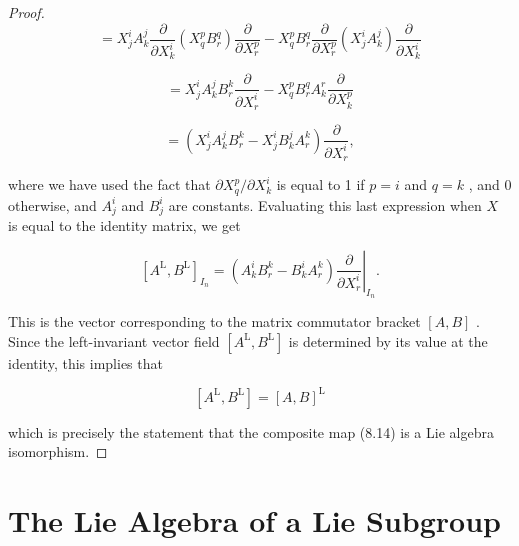 \begin{proof}
\[
= {X}_{j}^{i}{A}_{k}^{j}\frac{\partial }{\partial {X}_{k}^{i}}\left( {{X}_{q}^{p}{B}_{r}^{q}}\right) \frac{\partial }{\partial {X}_{r}^{p}} - {X}_{q}^{p}{B}_{r}^{q}\frac{\partial }{\partial {X}_{r}^{p}}\left( {{X}_{j}^{i}{A}_{k}^{j}}\right) \frac{\partial }{\partial {X}_{k}^{i}}
\]

\[
= {X}_{j}^{i}{A}_{k}^{j}{B}_{r}^{k}\frac{\partial }{\partial {X}_{r}^{i}} - {X}_{q}^{p}{B}_{r}^{q}{A}_{k}^{r}\frac{\partial }{\partial {X}_{k}^{p}}
\]

\[
= \left( {{X}_{j}^{i}{A}_{k}^{j}{B}_{r}^{k} - {X}_{j}^{i}{B}_{k}^{j}{A}_{r}^{k}}\right) \frac{\partial }{\partial {X}_{r}^{i}},
\]

where we have used the fact that $\partial {X}_{q}^{p}/\partial {X}_{k}^{i}$ is equal to 1 if $p = i$ and $q = k$ , and 0 otherwise, and ${A}_{j}^{i}$ and ${B}_{j}^{i}$ are constants. Evaluating this last expression when $X$ is equal to the identity matrix, we get

\[
{\left\lbrack  {A}^{\mathrm{L}},{B}^{\mathrm{L}}\right\rbrack  }_{{I}_{n}} = \left( {{A}_{k}^{i}{B}_{r}^{k} - {B}_{k}^{i}{A}_{r}^{k}}\right) {\left. \frac{\partial }{\partial {X}_{r}^{i}}\right| }_{{I}_{n}}.
\]

This is the vector corresponding to the matrix commutator bracket $\left\lbrack  {A, B}\right\rbrack$ . Since the left-invariant vector field $\left\lbrack  {{A}^{\mathrm{L}},{B}^{\mathrm{L}}}\right\rbrack$ is determined by its value at the identity, this implies that

\[
\left\lbrack  {{A}^{\mathrm{L}},{B}^{\mathrm{L}}}\right\rbrack   = {\left\lbrack  A, B\right\rbrack  }^{\mathrm{L}}
\]

which is precisely the statement that the composite map (8.14) is a Lie algebra isomorphism.
\end{proof}


\section{The Lie Algebra of a Lie Subgroup}


